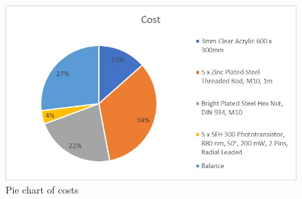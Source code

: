 \begin{figure}
    \includegraphics[width=\linewidth]{images/piechart.jpg}
    \caption{Pie chart of costs}
\end{figure}